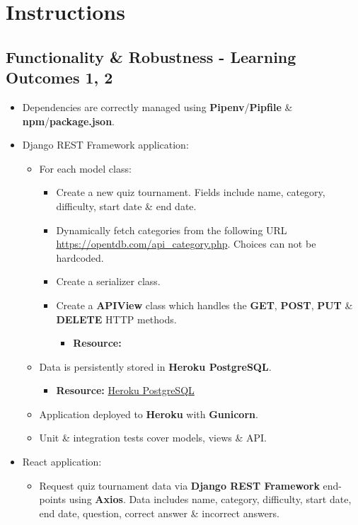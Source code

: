 \documentclass{article}
\begin{document}
\newpage

\section*{Instructions} 
\subsection*{Functionality \& Robustness - Learning Outcomes 1, 2}
\begin{itemize}
	\item Dependencies are correctly managed using \textbf{Pipenv}/\textbf{Pipfile} \& \textbf{npm}/\textbf{package.json}.
	\item Django REST Framework application:
	\begin{itemize}
		\item For each model class:
		\begin{itemize}
			\item Create a new quiz tournament. Fields include name, category, difficulty, start date \& end date. 
			\item Dynamically fetch categories from the following URL \href{https://opentdb.com/api\_category.php}{https://opentdb.com/api\_category.php}. Choices can not be hardcoded.
			\item Create a serializer class.
			\item Create a \textbf{APIView} class which handles the \textbf{GET}, \textbf{POST}, \textbf{PUT} \& \textbf{DELETE} HTTP methods.
			\begin{itemize}
				\item \textbf{Resource:}
			\end{itemize}
		\end{itemize} 
		\item Data is persistently stored in \textbf{Heroku PostgreSQL}.
		\begin{itemize}
			\item \textbf{Resource:} \href{https://www.heroku.com/postgres}{Heroku PostgreSQL}
		\end{itemize}
		\item Application deployed to \textbf{Heroku} with \textbf{Gunicorn}.
		\item Unit \& integration tests cover models, views \& API.
	\end{itemize}
	\item React application:
	\begin{itemize}
		\item Request quiz tournament data via \textbf{Django REST Framework} end-points using \textbf{Axios}. Data includes name, category, difficulty, start date, end date, question, correct answer \& incorrect answers. 

\end{itemize}
\end{itemize}
\end{document}
